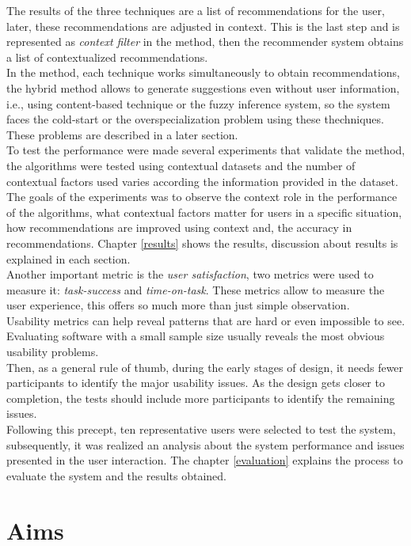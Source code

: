 The results of the three techniques are a list of recommendations for
the user, later, these recommendations are adjusted in context. This
is the last step and is represented as \textit{context filter} in the
method, then the recommender system obtains a list of contextualized
recommendations. \\
In the method, each technique works simultaneously to obtain
recommendations, the hybrid method allows to generate suggestions even
without user information, i.e., using content-based technique or the
fuzzy inference system, so the system faces the cold-start or the
overspecialization problem using these thechniques. These problems are
described in a later section. \\
To test the performance were made several experiments that validate
the method, the algorithms were tested using contextual datasets and
the number of contextual factors used varies according the information
provided in the dataset. The goals of the experiments was to observe
the context role in the performance of the algorithms, what contextual
factors matter for users in a specific situation, how recommendations
are improved using context and, the accuracy in recommendations.
Chapter \ref{results} shows the results, discussion about results is
explained in each section.\\
Another important metric is the \textit{user satisfaction},  two
metrics were used to measure it: \textit{task-success} and \textit
{time-on-task}. These metrics allow to measure the user experience,
this offers so much more than just simple observation.\\ Usability
metrics can help reveal patterns that are hard or even impossible to
see. Evaluating software with a small sample size usually reveals the
most obvious usability problems\cite{albert2013measuring}.\\ Then, as
a general rule of thumb, during the early stages of design, it needs
fewer participants to identify the major usability issues. As the
design gets closer to completion, the tests should include more
participants to identify the remaining
issues\cite{albert2013measuring}.\\ 
Following this precept, ten representative users were selected to test
the system, subsequently, it was realized an analysis about the system
performance and issues presented in the user interaction. The chapter
\ref{evaluation} explains the process to evaluate the system and the
results obtained.
\section{Aims}

